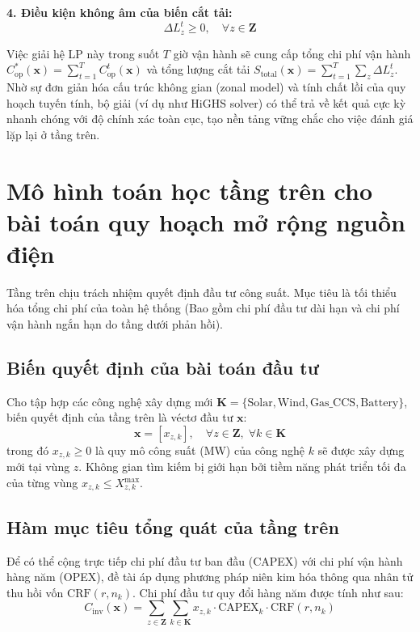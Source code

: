 \textbf{4. Điều kiện không âm của biến cắt tải:}
\begin{equation}
    \Delta L_z^t \geq 0, \quad \forall z \in \mathbf{Z}
\end{equation}

Việc giải hệ LP này trong suốt $T$ giờ vận hành sẽ cung cấp tổng chi phí vận hành $C_{\text{op}}^*(\mathbf{x}) = \sum_{t=1}^T C_{\text{op}}^t(\mathbf{x})$ và tổng lượng cắt tải $S_{\text{total}}(\mathbf{x}) = \sum_{t=1}^T \sum_z \Delta L_z^t$. Nhờ sự đơn giản hóa cấu trúc không gian (zonal model) và tính chất lồi của quy hoạch tuyến tính, bộ giải (ví dụ như HiGHS solver) có thể trả về kết quả cực kỳ nhanh chóng với độ chính xác toàn cục, tạo nền tảng vững chắc cho việc đánh giá lặp lại ở tầng trên.

\section{Mô hình toán học tầng trên cho bài toán quy hoạch mở rộng nguồn điện}

Tầng trên chịu trách nhiệm quyết định đầu tư công suất. Mục tiêu là tối thiểu hóa tổng chi phí của toàn hệ thống (Bao gồm chi phí đầu tư dài hạn và chi phí vận hành ngắn hạn do tầng dưới phản hồi).

\subsection{Biến quyết định của bài toán đầu tư}

Cho tập hợp các công nghệ xây dựng mới $\mathbf{K} = \{ \text{Solar}, \text{Wind}, \text{Gas\_CCS}, \text{Battery} \}$, biến quyết định của tầng trên là véctơ đầu tư $\mathbf{x}$:
\begin{equation}
    \mathbf{x} = [x_{z,k}], \quad \forall z \in \mathbf{Z}, \; \forall k \in \mathbf{K}
\end{equation}
trong đó $x_{z,k} \ge 0$ là quy mô công suất (MW) của công nghệ $k$ sẽ được xây dựng mới tại vùng $z$. Không gian tìm kiếm bị giới hạn bởi tiềm năng phát triển tối đa của từng vùng $x_{z,k} \le X_{z,k}^{\max}$.

\subsection{Hàm mục tiêu tổng quát của tầng trên}

Để có thể cộng trực tiếp chi phí đầu tư ban đầu (CAPEX) với chi phí vận hành hàng năm (OPEX), đề tài áp dụng phương pháp niên kim hóa thông qua nhân tử thu hồi vốn $\text{CRF}(r, n_k)$. Chi phí đầu tư quy đổi hàng năm được tính như sau:
\begin{equation}
    C_{\text{inv}}(\mathbf{x}) = \sum_{z \in \mathbf{Z}} \sum_{k \in \mathbf{K}} x_{z,k} \cdot \text{CAPEX}_k \cdot \text{CRF}(r, n_k)
\end{equation}

